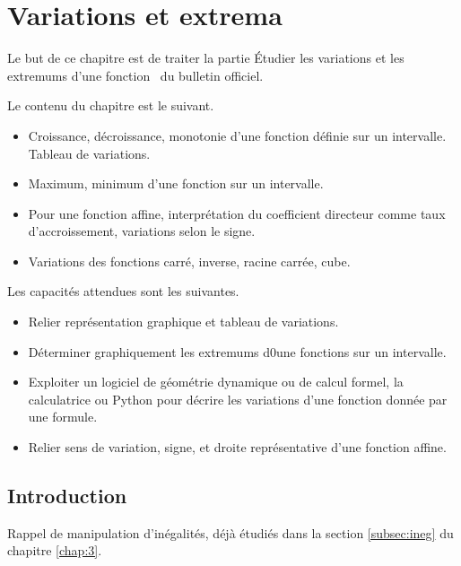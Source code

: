 
\chapter{Variations et extrema}

Le but de ce chapitre est de traiter la partie \og Étudier les variations et les extremums d'une fonction \fg~du bulletin officiel.

Le contenu du chapitre est le suivant.
	\begin{itemize}
		\item Croissance, décroissance, monotonie d'une fonction définie sur un intervalle. Tableau de variations.
		\item Maximum, minimum d'une fonction sur un intervalle.
		\item Pour une fonction affine, interprétation du coefficient directeur comme taux d'accroissement, variations selon le signe.
		\item Variations des fonctions carré, inverse, racine carrée, cube.
	\end{itemize}

Les capacités attendues sont les suivantes.
	\begin{itemize}
		\item Relier représentation graphique et tableau de variations.
		\item Déterminer graphiquement les extremums d0une fonctions sur un intervalle.
		\item Exploiter un logiciel de géométrie dynamique ou de calcul formel, la calculatrice ou Python pour décrire les variations d'une fonction donnée par une formule.
		\item Relier sens de variation, signe, et droite représentative d'une fonction affine.
	\end{itemize}
	
\section{Introduction}

Rappel de manipulation d'inégalités, déjà étudiés dans la section \ref{subsec:ineg} du chapitre \ref{chap:3}.


